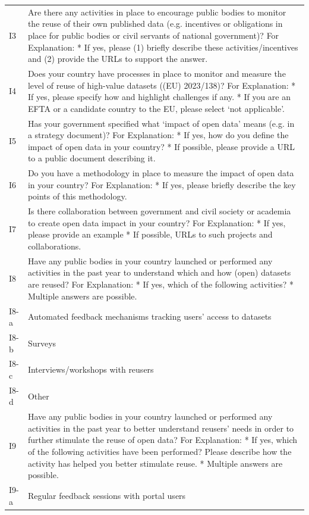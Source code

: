 {\begin{longtable}[]{@{}
  L{0.1386}
  L{0.8614}@{}}
I3 & Are there any activities in place to encourage public bodies to monitor the reuse of their own published data (e.g. incentives or obligations in place for public bodies or civil servants of national government)? For Explanation: * If yes, please (1) briefly describe these activities/incentives and (2) provide the URLs to support the answer. \\
I4 & Does your country have processes in place to monitor and measure the level of reuse of high-value datasets ((EU) 2023/138)? For Explanation: * If yes, please specify how and highlight challenges if any. * If you are an EFTA or a candidate country to the EU, please select `not applicable'. \\
I5 & Has your government specified what `impact of open data' means (e.g. in a strategy document)? For Explanation: * If yes, how do you define the impact of open data in your country? * If possible, please provide a URL to a public document describing it. \\
I6 & Do you have a methodology in place to measure the impact of open data in your country? For Explanation: * If yes, please briefly describe the key points of this methodology. \\
I7 & Is there collaboration between government and civil society or academia to create open data impact in your country? For Explanation: * If yes, please provide an example * If possible, URLs to such projects and collaborations. \\
I8 & Have any public bodies in your country launched or performed any activities in the past year to understand which and how (open) datasets are reused? For Explanation: * If yes, which of the following activities? * Multiple answers are possible. \\
I8-a & Automated feedback mechanisms tracking users' access to datasets \\
I8-b & Surveys \\
I8-c & Interviews/workshops with reusers \\
I8-d & Other \\
I9 & Have any public bodies in your country launched or performed any activities in the past year to better understand reusers' needs in order to further stimulate the reuse of open data? For Explanation: * If yes, which of the following activities have been performed? Please describe how the activity has helped you better stimulate reuse. * Multiple answers are possible. \\
I9-a & Regular feedback sessions with portal users \\

\end{longtable}}

